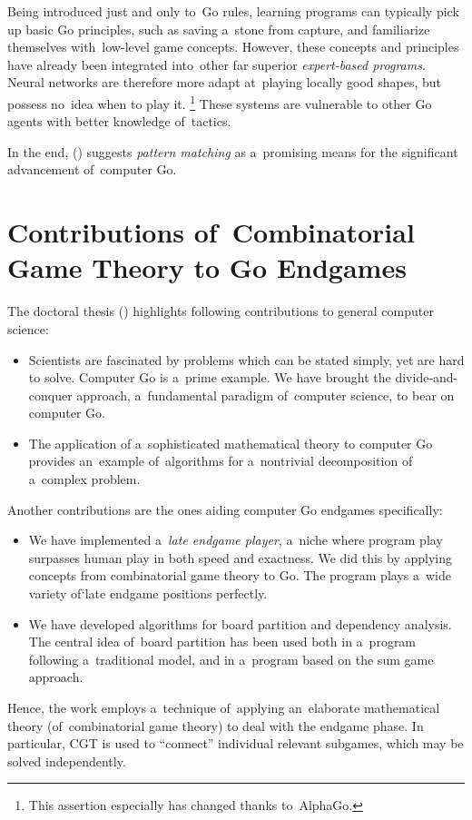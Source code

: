 Being introduced just and only to~Go rules, learning programs can typically pick up basic Go principles, such as saving a~stone from capture, and familiarize themselves with~low-level game concepts.
However, these concepts and principles have already been integrated into~other far superior \emph{expert-based programs}.
Neural networks are therefore more adapt at~playing locally good shapes, but possess no~idea when to play it.%
\footnote{This assertion especially has changed thanks to~AlphaGo.}
These systems are vulnerable to other Go agents with better knowledge of~tactics.

In the end, (\cite{Muller1995computer}) suggests \emph{pattern matching} as a~promising means for the significant advancement of~computer Go.

\section{Contributions of~Combinatorial Game Theory to Go Endgames}

The doctoral thesis (\cite{Muller1995computer}) highlights following contributions to general computer science:
\begin{itemize}
  \item Scientists are fascinated by problems which can be stated simply, yet are hard to solve.
    Computer Go is a~prime example.
    We have brought the divide-and-conquer approach, a~fundamental paradigm of~computer science, to bear on computer Go.

  \item The application of a~sophisticated mathematical theory to computer Go provides an~example of~algorithms for a~nontrivial decomposition of a~complex problem.
\end{itemize}
Another contributions are the ones aiding computer Go endgames specifically:
\begin{itemize}
  \item We have implemented a~\emph{late endgame player}, a~niche where program play surpasses human play in both speed and exactness.
    We did this by applying concepts from combinatorial game theory to Go.
    The program plays a~wide variety of`late endgame positions perfectly.

  \item We have developed algorithms for board partition and dependency analysis.
    The central idea of~board partition has been used both in a~program following a~traditional model, and in a~program based on the sum game approach.
\end{itemize}
Hence, the work employs a~technique of~applying an~elaborate mathematical theory (of~combinatorial game theory) to deal with the endgame phase.
In particular, CGT is used to ``connect'' individual relevant subgames, which may be solved independently.

